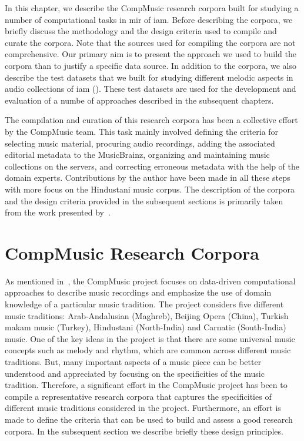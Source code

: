 In this chapter, we describe the CompMusic research corpora built for studying a number of computational tasks in \gls{mir} of \gls{iam}. Before describing the corpora, we briefly discuss the methodology and the design criteria used to compile and curate the corpora. Note that the sources used for compiling the corpora are not comprehensive. Our primary aim is to present the approach we used to build the corpora than to justify a specific data source. In addition to the corpora, we also describe the test datasets that we built for studying different melodic aspects in audio collections of \gls{iam} (). These test datasets are used for the development and evaluation of a numbe of approaches described in the subsequent chapters. 

The compilation and curation of this research corpora has been a collective effort by the CompMusic team. This task mainly involved defining the criteria for selecting music material, procuring audio recordings, adding the associated editorial metadata to the MusicBrainz, organizing and maintaining music collections on the servers, and correcting erroneous metadata with the help of the domain experts. Contributions by the author have been made in all these steps with more focus on the Hindustani music corpus. The description of the corpora and the design criteria provided in the subsequent sections is primarily taken from the work presented by~\cite{CM_Corpora_Ajay14,serra:14:corpus}.


\section{CompMusic Research Corpora}
\label{sec:corpus_compmusic_research_corpora}

As mentioned in~, the CompMusic project focuses on data-driven computational approaches to describe music recordings and emphasize the use of domain knowledge of a particular music tradition. The project considers five different music traditions: Arab-Andalusian (Maghreb), Beijing Opera (China), Turkish makam music (Turkey), Hindustani (North-India) and Carnatic (South-India) music. One of the key ideas in the project is that there are some universal music concepts such as melody and rhythm, which are common across different music traditions. But, many important aspects of a music piece can be better understood and appreciated by focusing on the specificities of the music tradition. Therefore, a significant effort in the CompMusic project has been to compile a representative research corpora that captures the specificities of different music traditions considered in the project. Furthermore, an effort is made to define the criteria that can be used to build and assess a good research corpora. In the subsequent section we describe briefly these design principles.

